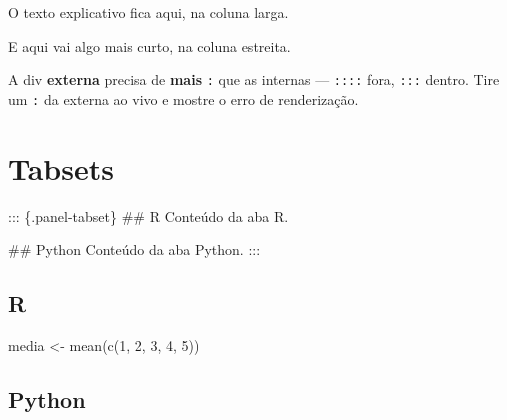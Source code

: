 \documentclass[
  brazilian,
  11pt,
  a4paper,
]{article}
\newenvironment{Shaded}{\begin{snugshade}}{\end{snugshade}}
\newcommand{\DecValTok}[1]{\textcolor[rgb]{0.68,0.00,0.00}{#1}}
\newcommand{\FunctionTok}[1]{\textcolor[rgb]{0.28,0.35,0.67}{#1}}
\newcommand{\NormalTok}[1]{\textcolor[rgb]{0.00,0.23,0.31}{#1}}
\newcommand{\OtherTok}[1]{\textcolor[rgb]{0.00,0.23,0.31}{#1}}
\begin{document}
O texto explicativo fica aqui, na coluna larga.

E aqui vai algo mais curto, na coluna estreita.

\begin{tcolorbox}[enhanced jigsaw, arc=.35mm, bottomrule=.15mm, bottomtitle=1mm, breakable, colback=white, colbacktitle=quarto-callout-warning-color!10!white, colframe=quarto-callout-warning-color-frame, coltitle=black, left=2mm, leftrule=.75mm, opacityback=0, opacitybacktitle=0.6, rightrule=.15mm, title=\textcolor{quarto-callout-warning-color}{\faExclamationTriangle}\hspace{0.5em}{O erro mais comum}, titlerule=0mm, toprule=.15mm, toptitle=1mm]

A div \textbf{externa} precisa de \textbf{mais} \texttt{:} que as
internas --- \texttt{::::} fora, \texttt{:::} dentro. Tire um \texttt{:}
da externa ao vivo e mostre o erro de renderização.

\end{tcolorbox}

\section{Tabsets}\label{tabsets}

\begin{Shaded}
\begin{Highlighting}[]
\NormalTok{::: \{.panel{-}tabset\}}
\FunctionTok{\#\# R}
\NormalTok{Conteúdo da aba R.}

\FunctionTok{\#\# Python}
\NormalTok{Conteúdo da aba Python.}
\NormalTok{:::}
\end{Highlighting}
\end{Shaded}

\subsection{R}

\begin{Shaded}
\begin{Highlighting}[]
\NormalTok{media }\OtherTok{\textless{}{-}} \FunctionTok{mean}\NormalTok{(}\FunctionTok{c}\NormalTok{(}\DecValTok{1}\NormalTok{, }\DecValTok{2}\NormalTok{, }\DecValTok{3}\NormalTok{, }\DecValTok{4}\NormalTok{, }\DecValTok{5}\NormalTok{))}
\end{Highlighting}
\end{Shaded}

\subsection{Python}
\end{document}
